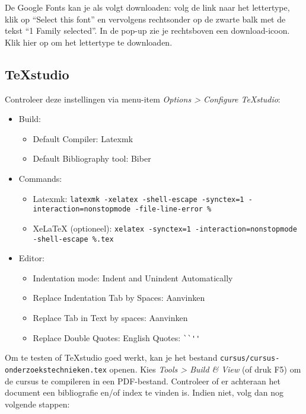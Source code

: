 De Google Fonts kan je als volgt downloaden: volg de link naar het lettertype, klik op ``Select this font'' en vervolgens rechtsonder op de zwarte balk met de tekst ``1 Family selected''. In de pop-up zie je rechtsboven een download-icoon. Klik hier op om het lettertype te downloaden.

\subsection{TeXstudio}

Controleer deze instellingen via menu-item \emph{Options > Configure TeXstudio}:

\begin{itemize}
  \item Build:
  \begin{itemize}
    \item Default Compiler: Latexmk
    \item Default Bibliography tool: Biber
  \end{itemize}
  \item Commands:
  \begin{itemize}
    \item Latexmk: \texttt{latexmk -xelatex -shell-escape -synctex=1 -interaction=nonstopmode -file-line-error \%}
    \item XeLaTeX (optioneel): \texttt{xelatex -synctex=1 -interaction=nonstopmode -shell-escape \%.tex}
  \end{itemize}
  \item Editor:
  \begin{itemize}
    \item Indentation mode: Indent and Unindent Automatically
    \item Replace Indentation Tab by Spaces: Aanvinken
    \item Replace Tab in Text by spaces: Aanvinken
    \item Replace Double Quotes: English Quotes: \verb|``''|
  \end{itemize}

\end{itemize}

Om te testen of TeXstudio goed werkt, kan je het bestand \texttt{cursus/cursus-onderzoekstech\-nie\-ken.tex} openen. Kies \emph{Tools > Build \& View} (of druk F5) om de cursus te compileren in een PDF-bestand. Controleer of er achteraan het document een bibliografie en/of index te vinden is. Indien niet, volg dan nog volgende stappen:

